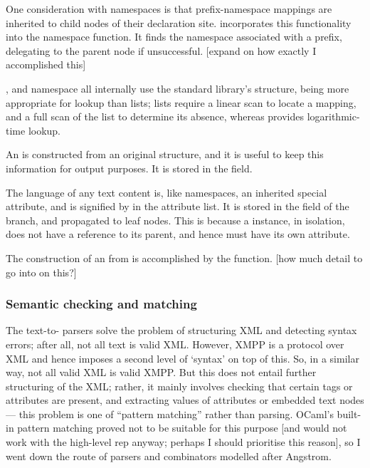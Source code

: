 \documentclass[12pt,a4paper,twoside,openright]{report}
\begin{document}
{One consideration with namespaces is that prefix-namespace mappings are inherited to child nodes of their declaration site.  incorporates this functionality into the namespace function. It finds the namespace associated with a prefix, delegating to the parent node if unsuccessful. [expand on how exactly I accomplished this]

,  and namespace all internally use the standard library's  structure, being more appropriate for lookup than lists; lists require a linear scan to locate a mapping, and a full scan of the list to determine its absence, whereas  provides logarithmic-time lookup.

An  is constructed from an original  structure, and it is useful to keep this information for output purposes. It is stored in the  field.

The language of any text content is, like namespaces, an inherited special attribute, and is signified by  in the attribute list. It is stored in the  field of the branch, and propagated to leaf  nodes. This is because a  instance, in isolation, does not have a reference to its parent, and hence must have its own  attribute.

The construction of an  from  is accomplished by the  function. [how much detail to go into on this?]

\subsubsection{Semantic checking and matching} \label{sec:matchers}
The text-to- parsers solve the problem of structuring XML and detecting syntax errors; after all, not all text is valid XML. However, XMPP is a protocol over XML and hence imposes a second level of `syntax' on top of this. So, in a similar way, not all valid XML is valid XMPP. But this does not entail further structuring of the XML; rather, it mainly involves checking that certain tags or attributes are present, and extracting values of attributes or embedded text nodes --- this problem is one of ``pattern matching'' rather than parsing. OCaml's built-in pattern matching proved not to be suitable for this purpose [and would not work with the high-level rep anyway; perhaps I should prioritise this reason], so I went down the route of parsers and combinators modelled after Angstrom.

}
\end{document}
